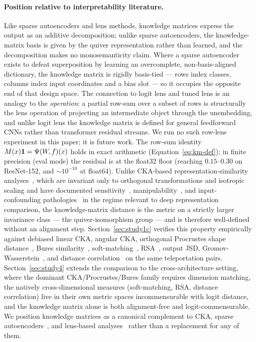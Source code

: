 \paragraph{Position relative to interpretability literature.}
Like sparse autoencoders \citep{bricken2023monosemanticity,
templeton2024scaling,cunningham2023sparse} and lens methods, knowledge
matrices express the output as an additive decomposition; unlike sparse
autoencoders, the knowledge-matrix basis is given by the quiver
representation rather than learned, and the decomposition makes no
monosemanticity claim. Where a sparse autoencoder exists to defeat
superposition by learning an overcomplete, non-basis-aligned dictionary,
the knowledge matrix is rigidly basis-tied --- rows index classes,
columns index input coordinates and a bias slot --- so it occupies the
opposite end of that design space. The connection to logit lens
\citep{nostalgebraist2020logitlens} and tuned lens
\citep{belrose2023tunedlens} is an analogy to the \emph{operation}: a
partial row-sum over a subset of rows is structurally the lens
operation of projecting an intermediate object through the unembedding,
and unlike logit lens the knowledge matrix is defined for general
feedforward CNNs rather than transformer residual streams. We run no
such row-lens experiment in this paper; it is future work. The row-sum
identity $M(x)\mathbf 1=\Psi(W\!,f)(x)$ holds in exact arithmetic
(Equation~\ref{eq:km-def}); in finite precision (eval mode) the residual
is at the float32 floor (reaching $0.15$--$0.30$ on ResNet-152, and
$\sim10^{-10}$ at float64).
Unlike CKA-based representation-similarity
analyses~\citep{kornblith2019similarity}, which are invariant only to
orthogonal transformations and isotropic scaling and have documented
sensitivity~\citep{ding2021grounding},
manipulability~\citep{davari2023reliability}, and input-confounding
pathologies~\citep{cui2022deconfounded} in the regime
relevant to deep representation comparison, the knowledge-matrix
distance is the metric on a strictly larger invariance class --- the
quiver-isomorphism group --- and is therefore well-defined without an
alignment step. Section~\ref{sec:study1c} verifies this property
empirically against debiased linear CKA, angular CKA, orthogonal
Procrustes shape distance~\citep{williams2021generalized},
Bures similarity~\citep{harvey2023bures}, soft-matching~\citep{khosla2024soft},
RSA~\citep{kriegeskorte2008representational}, output JSD, Gromov-Wasserstein~\citep{memoli2011gromov},
and distance correlation~\citep{szekely2007measuring} on the same
teleportation pairs. Section~\ref{sec:study4} extends the comparison
to the cross-architecture setting, where the dominant CKA/Procrustes/Bures
family requires dimension matching, the natively cross-dimensional measures
(soft-matching, RSA, distance correlation) live in their own metric spaces
incommensurable with logit distance, and the knowledge matrix alone is both
alignment-free and logit-commensurable.
We position knowledge matrices as a canonical complement to CKA, sparse
autoencoders~\citep{bricken2023monosemanticity, templeton2024scaling},
and lens-based analyses~\citep{nostalgebraist2020logitlens, belrose2023tunedlens}
rather than a replacement for any of them.

